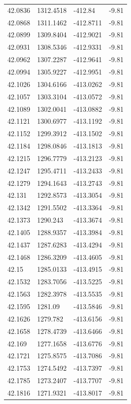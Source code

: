 \begin{table}[H]
\begin{tabular}{llll}
42.0836 & 1312.4518 & -412.84 & -9.81 \\
42.0868 & 1311.1462 & -412.8711 & -9.81 \\
42.0899 & 1309.8404 & -412.9021 & -9.81 \\
42.0931 & 1308.5346 & -412.9331 & -9.81 \\
42.0962 & 1307.2287 & -412.9641 & -9.81 \\
42.0994 & 1305.9227 & -412.9951 & -9.81 \\
42.1026 & 1304.6166 & -413.0262 & -9.81 \\
42.1057 & 1303.3104 & -413.0572 & -9.81 \\
42.1089 & 1302.0041 & -413.0882 & -9.81 \\
42.1121 & 1300.6977 & -413.1192 & -9.81 \\
42.1152 & 1299.3912 & -413.1502 & -9.81 \\
42.1184 & 1298.0846 & -413.1813 & -9.81 \\
42.1215 & 1296.7779 & -413.2123 & -9.81 \\
42.1247 & 1295.4711 & -413.2433 & -9.81 \\
42.1279 & 1294.1643 & -413.2743 & -9.81 \\
42.131 & 1292.8573 & -413.3054 & -9.81 \\
42.1342 & 1291.5502 & -413.3364 & -9.81 \\
42.1373 & 1290.243 & -413.3674 & -9.81 \\
42.1405 & 1288.9357 & -413.3984 & -9.81 \\
42.1437 & 1287.6283 & -413.4294 & -9.81 \\
42.1468 & 1286.3209 & -413.4605 & -9.81 \\
42.15 & 1285.0133 & -413.4915 & -9.81 \\
42.1532 & 1283.7056 & -413.5225 & -9.81 \\
42.1563 & 1282.3978 & -413.5535 & -9.81 \\
42.1595 & 1281.09 & -413.5846 & -9.81 \\
42.1626 & 1279.782 & -413.6156 & -9.81 \\
42.1658 & 1278.4739 & -413.6466 & -9.81 \\
42.169 & 1277.1658 & -413.6776 & -9.81 \\
42.1721 & 1275.8575 & -413.7086 & -9.81 \\
42.1753 & 1274.5492 & -413.7397 & -9.81 \\
42.1785 & 1273.2407 & -413.7707 & -9.81 \\
42.1816 & 1271.9321 & -413.8017 & -9.81 \\

\end{tabular}
\end{table}

